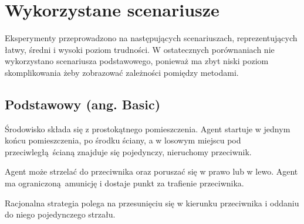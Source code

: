 \section{Wykorzystane scenariusze}
Eksperymenty przeprowadzono na następujących scenariuszach, reprezentujących łatwy, średni i wysoki poziom trudności. W ostatecznych porównaniach nie wykorzystano scenariusza podstawowego, ponieważ ma zbyt niski poziom skomplikowania żeby zobrazować zależności pomiędzy metodami.

\subsection{Podstawowy (ang. Basic)}\label{scenario_basic}
Środowisko składa się z prostokątnego pomieszczenia. Agent startuje w jednym końcu pomieszczenia, po środku ściany, a w losowym miejscu pod przeciwległą ścianą znajduje się pojedynczy, nieruchomy przeciwnik.

Agent może strzelać do przeciwnika oraz poruszać się w prawo lub w lewo. Agent ma ograniczoną amunicję i dostaje punkt za trafienie przeciwnika.

Racjonalna strategia polega na przesunięciu się w kierunku przeciwnika i oddaniu do niego pojedynczego strzału.


\begin{figure}[H]
	\begin{floatrow}
	\end{floatrow}
\end{figure}

